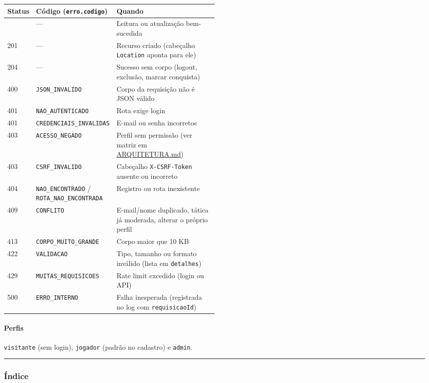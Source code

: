 \begin{longtable}[]{@{}llp{0.5\linewidth}@{}}
\toprule\noalign{}
Status & Código (\texttt{erro.codigo}) & Quando \\
\midrule\noalign{}
\endhead
\bottomrule\noalign{}
\endlastfoot
200 & --- & Leitura ou atualização bem-sucedida \\
201 & --- & Recurso criado (cabeçalho \texttt{Location} aponta para
ele) \\
204 & --- & Sucesso sem corpo (logout, exclusão, marcar conquista) \\
400 & \texttt{JSON\_INVALIDO} & Corpo da requisição não é JSON válido \\
401 & \texttt{NAO\_AUTENTICADO} & Rota exige login \\
401 & \texttt{CREDENCIAIS\_INVALIDAS} & E-mail ou senha incorretos \\
403 & \texttt{ACESSO\_NEGADO} & Perfil sem permissão (ver matriz em
\url{ARQUITETURA.md}) \\
403 & \texttt{CSRF\_INVALIDO} & Cabeçalho \texttt{X-CSRF-Token} ausente
ou incorreto \\
404 & \texttt{NAO\_ENCONTRADO} / \texttt{ROTA\_NAO\_ENCONTRADA} &
Registro ou rota inexistente \\
409 & \texttt{CONFLITO} & E-mail/nome duplicado, tática já moderada,
alterar o próprio perfil \\
413 & \texttt{CORPO\_MUITO\_GRANDE} & Corpo maior que 10 KB \\
422 & \texttt{VALIDACAO} & Tipo, tamanho ou formato inválido (lista em
\texttt{detalhes}) \\
429 & \texttt{MUITAS\_REQUISICOES} & Rate limit excedido (login ou
API) \\
500 & \texttt{ERRO\_INTERNO} & Falha inesperada (registrada no log com
\texttt{requisicaoId}) \\
\end{longtable}

\hypertarget{perfis}{%
\paragraph{Perfis}\label{perfis}}

\texttt{visitante} (sem login), \texttt{jogador} (padrão no cadastro) e
\texttt{admin}.

\begin{center}\rule{0.5\linewidth}{0.5pt}\end{center}

\hypertarget{uxedndice}{%
\subsubsection{Índice}\label{uxedndice}}

